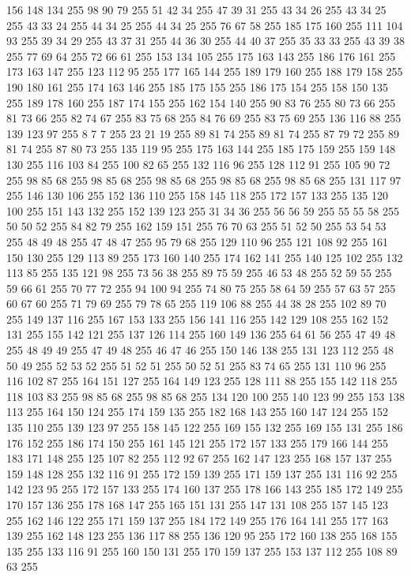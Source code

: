 156 148 134 255 98 90 79 255 51 42 34 255 47 39 31 255 43 34 26 255 43 34 25 255 43 33 24 255 44 34 25 255 44 34 25 255 76 67 58 255 185 175 160 255 111 104 93 255 39 34 29 255 43 37 31 255 44 36 30 255 44 40 37 255 35 33 33 255 43 39 38 255 77 69 64 255 72 66 61 255 153 134 105 255 175 163 143 255 186 176 161 255 173 163 147 255 123 112 95 255 177 165 144 255 189 179 160 255 188 179 158 255 190 180 161 255 174 163 146 255 185 175 155 255 186 175 154 255 158 150 135 255 189 178 160 255 187 174 155 255 162 154 140 255 90 83 76 255 80 73 66 255 81 73 66 255 82 74 67 255 83 75 68 255 84 76 69 255 83 75 69 255 136 116 88 255 139 123 97 255 8 7 7 255 23 21 19 255 89 81 74 255 89 81 74 255 87 79 72 255 89 81 74 255 87 80 73 255 135 119 95 255 175 163 144 255 185 175 159 255 159 148 130 255 116 103 84 255 100 82 65 255 132 116 96 255 128 112 91 255 105 90 72 255 98 85 68 255 98 85 68 255 98 85 68 255
98 85 68 255 98 85 68 255 131 117 97 255 146 130 106 255 152 136 110 255 158 145 118 255 172 157 133 255 135 120 100 255 151 143 132 255 152 139 123 255 31 34 36 255 56 56 59 255 55 55 58 255 50 50 52 255 84 82 79 255 162 159 151 255 76 70 63 255 51 52 50 255 53 54 53 255 48 49 48 255 47 48 47 255 95 79 68 255 129 110 96 255 121 108 92 255 161 150 130 255 129 113 89 255 173 160 140 255 174 162 141 255 140 125 102 255 132 113 85 255 135 121 98 255 73 56 38 255 89 75 59 255 46 53 48 255 52 59 55 255 59 66 61 255 70 77 72 255 94 100 94 255 74 80 75 255 58 64 59 255 57 63 57 255 60 67 60 255 71 79 69 255 79 78 65 255 119 106 88 255 44 38 28 255 102 89 70 255 149 137 116 255 167 153 133 255 156 141 116 255 142 129 108 255 162 152 131 255 155 142 121 255 137 126 114 255 160 149 136 255 64 61 56 255 47 49 48 255 48 49 49 255 47 49 48 255 46 47 46 255 150 146 138 255 131 123 112 255 48 50 49 255 52 53 52 255
51 52 51 255 50 52 51 255 83 74 65 255 131 110 96 255 116 102 87 255 164 151 127 255 164 149 123 255 128 111 88 255 155 142 118 255 118 103 83 255 98 85 68 255 98 85 68 255 134 120 100 255 140 123 99 255 153 138 113 255 164 150 124 255 174 159 135 255 182 168 143 255 160 147 124 255 152 135 110 255 139 123 97 255 158 145 122 255 169 155 132 255 169 155 131 255 186 176 152 255 186 174 150 255 161 145 121 255 172 157 133 255 179 166 144 255 183 171 148 255 125 107 82 255 112 92 67 255 162 147 123 255 168 157 137 255 159 148 128 255 132 116 91 255 172 159 139 255 171 159 137 255 131 116 92 255 142 123 95 255 172 157 133 255 174 160 137 255 178 166 143 255 185 172 149 255 170 157 136 255 178 168 147 255 165 151 131 255 147 131 108 255 157 145 123 255 162 146 122 255 171 159 137 255 184 172 149 255 176 164 141 255 177 163 139 255 162 148 123 255 136 117 88 255 136 120 95 255 172 160 138 255 168 155 135 255 133 116 91 255 160 150 131 255 170 159 137 255 153 137 112 255 108 89 63 255
